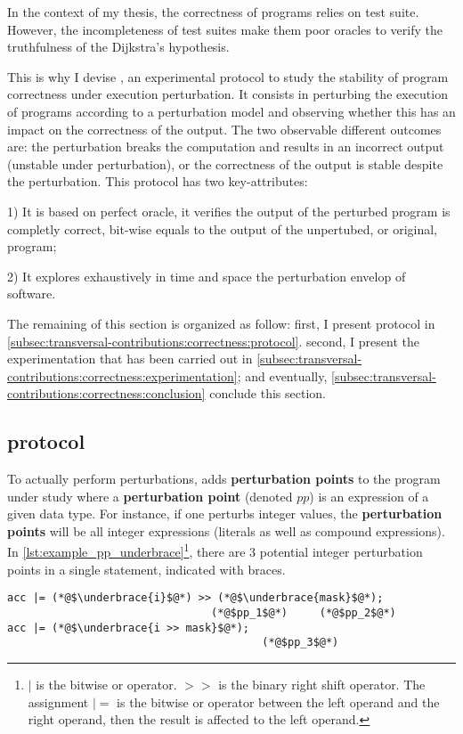 In the context of my thesis, the correctness of programs relies on test suite.
However, the incompleteness of test suites make them poor oracles to verify the truthfulness of the Dijkstra's hypothesis.

This is why I devise \perturb, an experimental protocol to study the stability of program correctness under execution perturbation.
It consists in perturbing the execution of programs according to a perturbation model and observing whether this has an impact on the correctness of the output.
The two observable different outcomes are: 
the perturbation breaks the computation and results in an incorrect output (unstable under perturbation), 
or the correctness of the output is stable despite the perturbation.
This protocol has two key-attributes:

1) It is based on perfect oracle, \ie it verifies the output of the perturbed program is completly correct, \ie bit-wise equals to the output of the unpertubed, or original, program;

2) It explores exhaustively in time and space the perturbation envelop of software.

The remaining of this section is organized as follow: 
first, I present \perturb protocol in \autoref{subsec:transversal-contributions:correctness:protocol}.
second, I present the experimentation that has been carried out in \autoref{subsec:transversal-contributions:correctness:experimentation};
and eventually, \autoref{subsec:transversal-contributions:correctness:conclusion} conclude this section.

\subsection{\perturb protocol}
\label{subsec:transversal-contributions:correctness:protocol}

To actually perform perturbations, \perturb adds \textbf{perturbation points} to the program under study where a \textbf{perturbation point} (denoted $pp$) is an expression of a given data type.
For instance, if one perturbs integer values, the \textbf{perturbation points} will be all integer expressions (literals as well as compound expressions). 
In \autoref{lst:example_pp_underbrace}\footnote{$|$ is the bitwise or operator. $>>$ is the binary right shift operator. The assignment $|=$ is the bitwise or operator between the left operand and the right operand, then the result is affected to the left operand.}, there are 3 potential integer perturbation points in a single statement, indicated with braces.
\begin{lstlisting}[basicstyle=\small, caption=Three integer \textbf{perturbation points} in a single statement., label=lst:example_pp_underbrace]
acc |= (*@$\underbrace{i}$@*) >> (*@$\underbrace{mask}$@*);
								(*@$pp_1$@*)     (*@$pp_2$@*)
acc |= (*@$\underbrace{i >> mask}$@*);
										(*@$pp_3$@*)  
\end{lstlisting}

